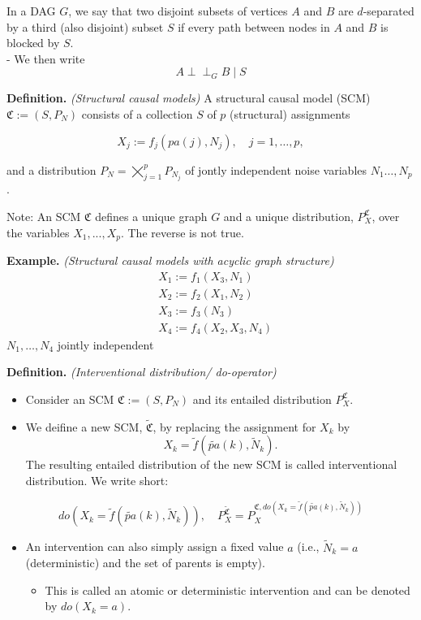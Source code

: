 \documentclass[a4paper,12pt,openany]{book}
\providecommand{\tightlist}{%
 \setlength{\itemsep}{0pt}\setlength{\parskip}{0pt}}
\begin{document}
In a DAG \(G\), we say that two disjoint subsets of vertices \(A\) and \(B\) are \(d\)-separated by a third (also disjoint) subset \(S\) if every path between nodes in \(A\) and \(B\) is blocked by \(S\).\\
- We then write
\[
    A \perp\!\!\!\!\perp_G B \mid S
    \]

\textbf{Definition.} \emph{(Structural causal models)} A structural causal model (SCM) \(\mathfrak{C}:=\left(S, P_N\right)\) consists of a collection \(S\) of \(p\) (structural) assignments

\[
X_j:=f_j\left(pa(j), N_j\right), \quad j=1, \ldots, p,
\]

and a distribution \(P_N=\bigtimes_{j=1}^p P_{N_j}\) of jontly independent noise variables \(N_1\dots,N_p\).

Note: An SCM \(\mathfrak{C}\) defines a unique graph \(G\) and a unique distribution, \(P^{\mathfrak{C}}_X\), over the variables \(X_1,...,X_p\). The reverse is not true.

\textbf{Example.} \emph{(Structural causal models with acyclic graph structure)}
\begin{align*}
& X_1:=f_1\left(X_3, N_1\right) \\
& X_2:=f_2\left(X_1, N_2\right) \\
& X_3:=f_3\left(N_3\right) \\
& X_4:=f_4\left(X_2, X_3, N_4\right)
\end{align*}
\(N_1, \ldots, N_4\) jointly independent

\textbf{Definition.} \emph{(Interventional distribution/ do-operator)}

\begin{itemize}
\item
  Consider an SCM \(\mathfrak C := (S,P_N)\) and its entailed distribution \(P^{\mathfrak C}_X\).
\item
  We deifine a new SCM, \(\tilde {\mathfrak C}\), by replacing the assignment for \(X_k\) by
  \[ 
  X_k = \tilde f(\tilde {pa}(k), \tilde N_k).
  \]
  The resulting entailed distribution of the new SCM is called interventional distribution.
  We write short:
\end{itemize}

\[
do(X_k = \tilde f(\tilde {pa}(k), \tilde N_k)), \quad P_X^{\tilde {\mathfrak C}}=P^{\mathfrak C, do(X_k = \tilde f(\tilde {pa}(k), \tilde N_k))}_X
\]

\begin{itemize}
\tightlist
\item
  An intervention can also simply assign a fixed value \(a\) (i.e., \(\tilde N_k=a\) (deterministic) and the set of parents is empty).

  \begin{itemize}
  \tightlist
  \item
    This is called an atomic or deterministic intervention and can be denoted by \(do(X_k = a)\).
  \end{itemize}
\end{itemize}
\end{document}
